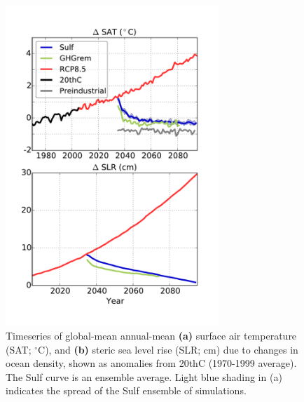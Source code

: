 \documentclass[draft,grl]{AGUTeX}  %
\begin{document}
\begin{article}
\begin{figure}[htbp] %
\centering
 \noindent\includegraphics[width=19pc]{figures/SAT_SLR_timeseries_geotimescalesWAISpaper.pdf} %
\caption{Timeseries of global-mean annual-mean \textbf{(a)} surface air temperature (SAT; $^\circ$C), and \textbf{(b)} steric sea level rise (SLR; cm) due to changes in ocean density, shown as anomalies from 20thC (1970-1999 average). The Sulf curve is an ensemble average. Light blue shading in (a) indicates the spread of the Sulf ensemble of simulations.}
\label{fig:gmts} %
\end{figure}



\end{article}
\end{document}
